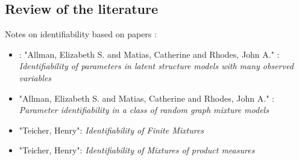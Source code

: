 


\subsection{Review of the literature}
Notes on identifiability based on papers : 

\begin{itemize}
\item \cite{AMR09} : "Allman, Elizabeth S. and Matias, Catherine and Rhodes, John A." : \emph{Identifiability of parameters in latent structure models with many observed variables}
\item \cite{AMR10} "Allman, Elizabeth S. and Matias, Catherine and Rhodes, John A." :  \emph{Parameter identifiability in a class of random graph mixture models}
\item \cite{T63}"Teicher, Henry":    \emph{Identifiability of Finite Mixtures}
\item \cite{T67} "Teicher, Henry":    \emph{Identifiability of Mixtures of product measures}
\end{itemize}

\vspace{2em}


